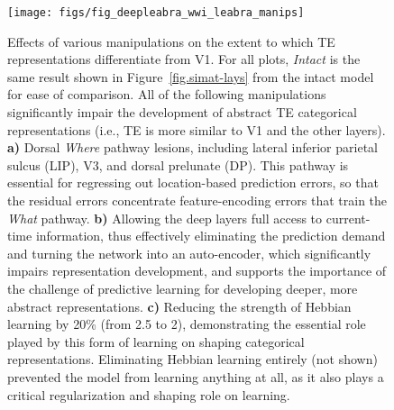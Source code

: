 \documentclass[11pt,twoside]{article}
\newif\myifpdf
\begin{document}
\begin{figure}
  \centering\texttt{[image: figs/fig\_deepleabra\_wwi\_leabra\_manips]}
  \caption{\footnotesize Effects of various manipulations on the extent to which TE representations differentiate from V1.  For all plots, \emph{Intact} is the same result shown in Figure~\ref{fig.simat-lays} from the intact model for ease of comparison.  All of the following  manipulations significantly impair the development of abstract TE categorical representations (i.e., TE is more similar to V1 and the other layers).  {\bf a)} Dorsal \emph{Where} pathway lesions, including lateral inferior parietal sulcus (LIP), V3, and dorsal prelunate (DP).  This pathway is essential for regressing out location-based prediction errors, so that the residual errors concentrate feature-encoding errors that train the \emph{What} pathway.  {\bf b)} Allowing the deep layers full access to current-time information, thus effectively eliminating the prediction demand and turning the network into an auto-encoder, which significantly impairs representation development, and supports the importance of the challenge of predictive learning for developing deeper, more abstract representations.  {\bf c)} Reducing the strength of Hebbian learning by 20\% (from 2.5 to 2), demonstrating the essential role played by this form of learning on shaping categorical representations.  Eliminating Hebbian learning entirely (not shown) prevented the model from learning anything at all, as it also plays a critical regularization and shaping role on learning.}
  \label{fig.manips}
\end{figure}
\end{document}
